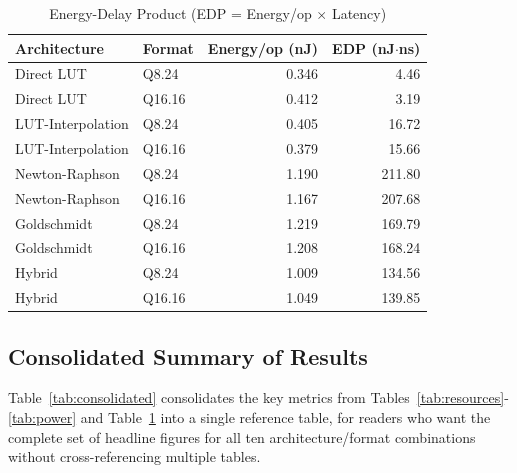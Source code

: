 \documentclass[manuscript,screen,review]{acmart}
\begin{document}
\begin{table}[H]
\caption{Energy-Delay Product (EDP = Energy/op $\times$ Latency)}
\label{tab:edp}
\begin{tabular}{@{}llrr@{}}
\toprule
\textbf{Architecture} & \textbf{Format} & \textbf{Energy/op (nJ)} & \textbf{EDP (nJ$\cdot$ns)} \\
\midrule
Direct LUT & Q8.24 & 0.346 & 4.46 \\
Direct LUT & Q16.16 & 0.412 & 3.19 \\
LUT-Interpolation & Q8.24 & 0.405 & 16.72 \\
LUT-Interpolation & Q16.16 & 0.379 & 15.66 \\
Newton-Raphson & Q8.24 & 1.190 & 211.80 \\
Newton-Raphson & Q16.16 & 1.167 & 207.68 \\
Goldschmidt & Q8.24 & 1.219 & 169.79 \\
Goldschmidt & Q16.16 & 1.208 & 168.24 \\
Hybrid & Q8.24 & 1.009 & 134.56 \\
Hybrid & Q16.16 & 1.049 & 139.85 \\
\bottomrule
\end{tabular}
\end{table}

\subsection{Consolidated Summary of Results}
\label{sec:consolidated}

Table~\ref{tab:consolidated} consolidates the key metrics from Tables~\ref{tab:resources}-\ref{tab:power} and Table~\ref{tab:edp} into a single reference table, for readers who want the complete set of headline figures for all ten architecture/format combinations without cross-referencing multiple tables.
\end{document}
